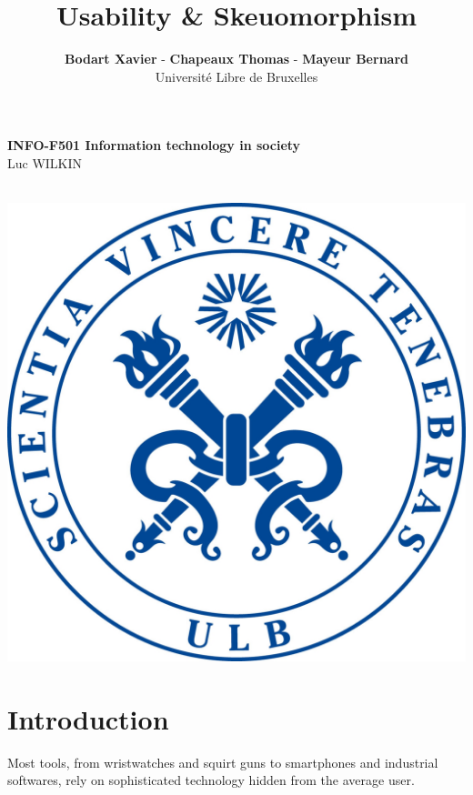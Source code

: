 \documentclass[a4paper,11pt] {article}
\theoremstyle{definition}
\begin{document}
\title{\textbf{Usability \& Skeuomorphism}}
\author{\textbf{Bodart Xavier} - \textbf{Chapeaux Thomas} - \textbf{Mayeur Bernard} \\
Université Libre de Bruxelles}

\maketitle
\begin{center}

\textbf{INFO-F501 Information technology in society} \\
Luc WILKIN
\end{center}
\begin{center}

~\\

\includegraphics[scale=0.15]{ULBjea.jpg}
\end{center}
\pagebreak
\tableofcontents
\pagebreak
\section{Introduction}

Most tools, from wristwatches and squirt guns to smartphones and industrial softwares, rely on sophisticated technology hidden from the average user.
\end{document}
